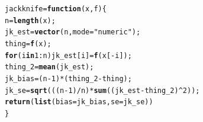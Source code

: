 \documentclass[12pt,english]{article}\usepackage[]{graphicx}\usepackage[]{xcolor}
\makeatletter
\newcommand{\hlnum}[1]{\textcolor[rgb]{0.686,0.059,0.569}{#1}}%
\newcommand{\hlsng}[1]{\textcolor[rgb]{0.192,0.494,0.8}{#1}}%
\newcommand{\hlopt}[1]{\textcolor[rgb]{0,0,0}{#1}}%
\newcommand{\hldef}[1]{\textcolor[rgb]{0.345,0.345,0.345}{#1}}%
\newcommand{\hlkwa}[1]{\textcolor[rgb]{0.161,0.373,0.58}{\textbf{#1}}}%
\newcommand{\hlkwb}[1]{\textcolor[rgb]{0.69,0.353,0.396}{#1}}%
\newcommand{\hlkwc}[1]{\textcolor[rgb]{0.333,0.667,0.333}{#1}}%
\newcommand{\hlkwd}[1]{\textcolor[rgb]{0.737,0.353,0.396}{\textbf{#1}}}%
\newenvironment{kframe}{%
 \def\at@end@of@kframe{}%
 \ifinner\ifhmode%
  \def\at@end@of@kframe{\end{minipage}}%
  \begin{minipage}{\columnwidth}%
 \fi\fi%
 \def\FrameCommand##1{\hskip\@totalleftmargin \hskip-\fboxsep
 \colorbox{shadecolor}{##1}\hskip-\fboxsep
     \hskip-\linewidth \hskip-\@totalleftmargin \hskip\columnwidth}%
 \MakeFramed {\advance\hsize-\width
   \@totalleftmargin\z@ \linewidth\hsize
   \@setminipage}}%
 {\par\unskip\endMakeFramed%
 \at@end@of@kframe}
\newenvironment{knitrout}{}{} %
\makeatother
\begin{document}
\begin{enumerate}[label=\arabic*.]
\begin{enumerate}[label=(\alph*)]
\begin{enumerate}[label=(\alph*)]
\begin{knitrout}
\begin{kframe}
\begin{alltt}
\hldef{jackknife} \hlkwb{=} \hlkwa{function}\hldef{(}\hlkwc{x}\hldef{,}\hlkwc{f}\hldef{) \{}
        \hldef{n} \hlkwb{=} \hlkwd{length}\hldef{(x);}
        \hldef{jk_est} \hlkwb{=} \hlkwd{vector}\hldef{(n,}\hlkwc{mode}\hldef{=}\hlsng{"numeric"}\hldef{);}
        \hldef{thing} \hlkwb{=} \hlkwd{f}\hldef{(x);}
        \hlkwa{for}\hldef{(i} \hlkwa{in} \hlnum{1}\hlopt{:}\hldef{n) jk_est[i]} \hlkwb{=} \hlkwd{f}\hldef{(x[}\hlopt{-}\hldef{i]);}
        \hldef{thing_2} \hlkwb{=} \hlkwd{mean}\hldef{(jk_est);}
        \hldef{jk_bias} \hlkwb{=} \hldef{(n}\hlopt{-}\hlnum{1}\hldef{)}\hlopt{*}\hldef{(thing_2} \hlopt{-} \hldef{thing);}
        \hldef{jk_se} \hlkwb{=} \hlkwd{sqrt}\hldef{(((n} \hlopt{-} \hlnum{1}\hldef{)}\hlopt{/}\hldef{n)}\hlopt{*}\hlkwd{sum}\hldef{((jk_est} \hlopt{-} \hldef{thing_2)}\hlopt{^}\hlnum{2}\hldef{));}
        \hlkwd{return}\hldef{(}\hlkwd{list}\hldef{(}\hlkwc{bias}\hldef{=jk_bias,}\hlkwc{se}\hldef{=jk_se))}
\hldef{\}}


\end{alltt}
\end{kframe}
\end{knitrout}
\end{enumerate}
\end{enumerate}
\end{enumerate}
\end{document}
